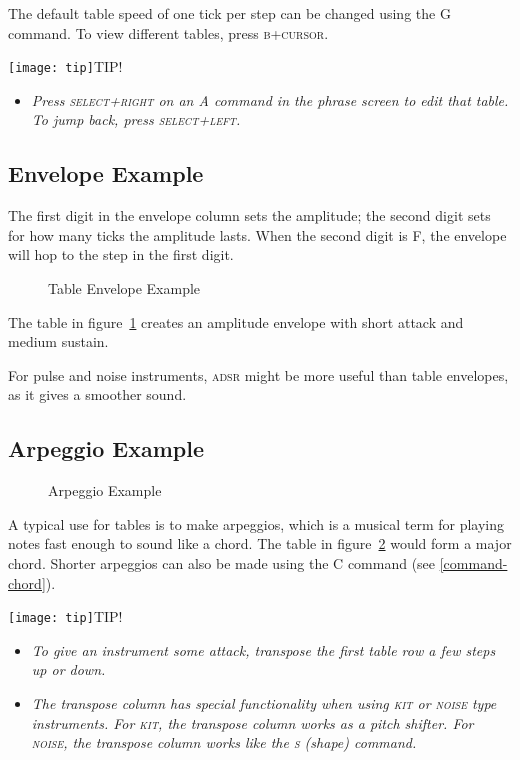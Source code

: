 The default table speed of one tick per step can be changed using the G command. To view different tables, press \textsc{b+cursor}.

\texttt{[image: tip]}TIP!
\begin{itemize}
	\item \textit{Press \textsc{select+right} on an A command in the phrase screen to edit that table. To jump back, press \textsc{select+left}.}
\end{itemize}

\subsection{Envelope Example}

The first digit in the envelope column sets the amplitude; the second digit sets for how many ticks the amplitude lasts.
When the second digit is F, the envelope will hop to the step in the first digit.

\begin{figure}[htpb]
	\begin{center}
	\end{center}
	\caption{Table Envelope Example}
	\label{fig:table-amp}
\end{figure}

The table in figure~\ref{fig:table-amp} creates an amplitude envelope with short attack and medium sustain.

For pulse and noise instruments, \textsc{adsr} might be more useful than table envelopes, as it gives a smoother sound.

\subsection{Arpeggio Example}

\begin{figure}[htpb]
	\begin{center}
	\end{center}
	\caption{Arpeggio Example}
	\label{fig:table-arp}
\end{figure}

A typical use for tables is to make arpeggios, which is a musical term for playing notes fast enough to sound like a chord. The table in figure~\ref{fig:table-arp} would form a major chord. Shorter arpeggios can also be made using the C command (see \ref{command-chord}).

\texttt{[image: tip]}TIP!
\begin{itemize}
	\item \textit{To give an instrument some attack, transpose the first table row a few steps up or down.}
	\item \textit{The transpose column has special functionality when using \textsc{kit} or \textsc{noise} type instruments. For \textsc{kit}, the transpose column works as a pitch shifter. For \textsc{noise}, the transpose column works like the \textsc{s} (shape) command.}
\end{itemize}

